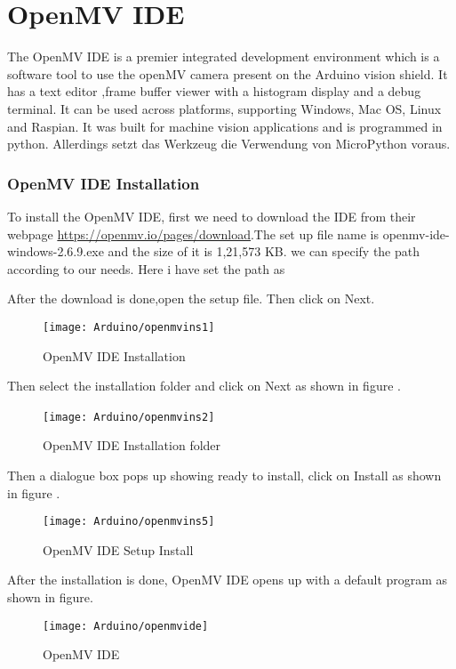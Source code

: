 %
%




\chapter{OpenMV IDE}




The OpenMV IDE is a premier integrated development environment which is a software tool  to use the openMV camera present on the Arduino vision shield.  It has a text editor ,frame buffer viewer with a histogram display and a debug terminal. It can be used across platforms, supporting Windows, Mac OS, Linux and Raspian. It was built for machine vision applications and is programmed in python\cite{OpenMV:2021}. Allerdings setzt das Werkzeug die Verwendung von MicroPython voraus. 

\subsection{OpenMV IDE Installation}
To install the OpenMV IDE, first we need to download the IDE from their webpage \url{https://openmv.io/pages/download}.The set up file name is openmv-ide-windows-2.6.9.exe and the size of it is 1,21,573 KB. we can specify the path according to our needs. Here i have set the path as 

After the download is done,open the setup file.
Then click on Next.
\begin{figure}[H]
	\centering
	\texttt{[image: Arduino/openmvins1]}
	\caption{OpenMV IDE Installation}
	\label{figure 6.4}
\end{figure}

Then select the installation folder and click on Next as shown in figure .
\begin{figure}[H]
	\centering
	\texttt{[image: Arduino/openmvins2]}\
	\caption{OpenMV IDE Installation folder}
	\label{figure 6.5}
\end{figure}
Then a dialogue box pops up showing ready to install, click on Install as shown in figure .
\begin{figure}[H]
	\centering
	\texttt{[image: Arduino/openmvins5]}
	\caption{OpenMV IDE Setup Install}
	\label{figure 6.6}
\end{figure}
After the installation is done, OpenMV IDE opens up with a default program as shown in figure.
\begin{figure}[H]
	\centering
	\texttt{[image: Arduino/openmvide]}
	\caption{OpenMV IDE}
	\label{figure 6.7}
\end{figure}


